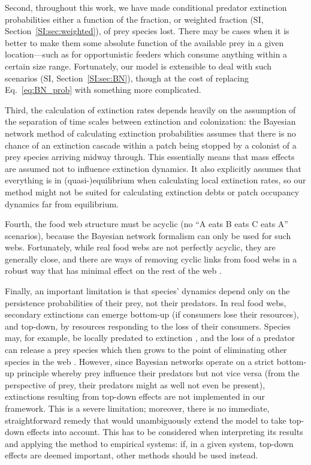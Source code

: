 \documentclass[11pt]{article}
\newcommand{\SI}{SI}
\begin{document}
Second, throughout this work, we have made conditional predator extinction probabilities either a function of the fraction, or weighted fraction (\SI, Section~\ref{SI:sec:weighted}), of prey species lost. There may be cases when it is better to make them some absolute function of the available prey in a given location---such as for opportunistic feeders which consume anything within a certain size range. Fortunately, our model is extensible to deal with such scenarios (\SI, Section~\ref{SI:sec:BN}), though at the cost of replacing Eq.~\ref{eq:BN_prob} with something more complicated.

Third, the calculation of extinction rates depends heavily on the assumption of the separation of time scales between extinction and colonization: the Bayesian network method of calculating extinction probabilities assumes that there is no chance of an extinction cascade within a patch being stopped by a colonist of a prey species arriving midway through. This essentially means that mass effects are assumed not to influence extinction dynamics. It also explicitly assumes that everything is in (quasi-)equilibrium when calculating local extinction rates, so our method might not be suited for calculating extinction debts or patch occupancy dynamics far from equilibrium.

Fourth, the food web structure must be acyclic (no ``A eats B eats C eats A'' scenarios), because the Bayesian network formalism can only be used for such webs. Fortunately, while real food webs are not perfectly acyclic, they are generally close, and there are ways of removing cyclic links from food webs in a robust way that has minimal effect on the rest of the web \citep{Allesinaetal2009, Eklofetal2013MEE}.

Finally, an important limitation is that species' dynamics depend only on the persistence probabilities of their prey, not their predators. In real food webs, secondary extinctions can emerge bottom-up (if consumers lose their resources), and top-down, by resources responding to the loss of their consumers. Species may, for example, be locally predated to extinction \citep{Huffaker1958, Schoeneretal2001}, and the loss of a predator can release a prey species which then grows to the point of eliminating other species in the web \citep{Paine1966, Paine1974, LaffertySuchanek2016}. However, since Bayesian networks operate on a strict bottom-up principle whereby prey influence their predators but not vice versa (from the perspective of prey, their predators might as well not even be present), extinctions resulting from top-down effects are not implemented in our framework. This is a severe limitation; moreover, there is no immediate, straightforward remedy that would unambiguously extend the model to take top-down effects into account. This has to be considered when interpreting its results and applying the method to empirical systems: if, in a given system, top-down effects are deemed important, other methods should be used instead.
\end{document}
